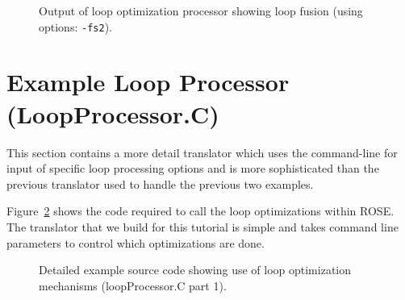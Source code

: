 \begin{figure}[!h]
{\indent
{\mySmallFontSize


\begin{latexonly}
   
\end{latexonly}

\begin{htmlonly}
   
\end{htmlonly}

}
}
\caption{Output of loop optimization processor showing loop fusion (using options: {\tt -fs2}).}
\label{Tutorial:exampleOutput_LoopOptimization_fusion}
\end{figure}


\section{Example Loop Processor (LoopProcessor.C)}
     This section contains a more detail translator which uses the command-line for input
    of specific loop processing options and is more sophisticated than the previous
    translator used to handle the previous two examples.

   Figure~\ref{Tutorial:exampleLoopProcessor} shows the code required to
call the loop optimizations within ROSE.  The translator that we build for this tutorial
is simple and takes command line parameters to control which optimizations are done.

\begin{figure}[!h]
{\indent
{\mySmallFontSize


\begin{latexonly}
   
\end{latexonly}

\begin{htmlonly}
   
\end{htmlonly}

}
}
\caption{Detailed example source code showing use of loop optimization mechanisms
    (loopProcessor.C part 1).}
\label{Tutorial:exampleLoopProcessor}
\end{figure}

